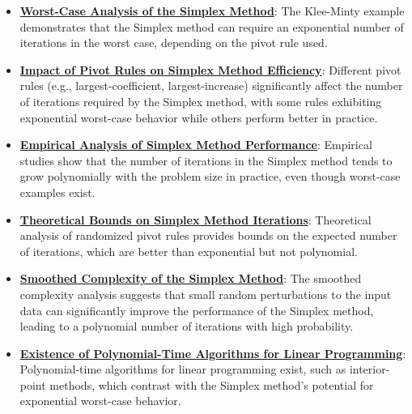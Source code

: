 \documentclass{article}%
\begin{document}
\begin{itemize}[leftmargin=*]%
\item \href{https://www.math.purdue.edu/~yipn/421/2024-09-05-SimplexEfficiency.pdf#page=2}{\textbf{Worst{-}Case Analysis of the Simplex Method}}: The Klee-Minty example demonstrates that the Simplex method can require an exponential number of iterations in the worst case, depending on the pivot rule used.%
\item \href{https://www.math.purdue.edu/~yipn/421/2024-09-05-SimplexEfficiency.pdf#page=3}{\textbf{Impact of Pivot Rules on Simplex Method Efficiency}}: Different pivot rules (e.g., largest-coefficient, largest-increase) significantly affect the number of iterations required by the Simplex method, with some rules exhibiting exponential worst-case behavior while others perform better in practice.%
\item \href{https://www.math.purdue.edu/~yipn/421/2024-09-05-SimplexEfficiency.pdf#page=9}{\textbf{Empirical Analysis of Simplex Method Performance}}: Empirical studies show that the number of iterations in the Simplex method tends to grow polynomially with the problem size in practice, even though worst-case examples exist.%
\item \href{https://www.math.purdue.edu/~yipn/421/2024-09-05-SimplexEfficiency.pdf#page=10}{\textbf{Theoretical Bounds on Simplex Method Iterations}}: Theoretical analysis of randomized pivot rules provides bounds on the expected number of iterations, which are better than exponential but not polynomial.%
\item \href{https://www.math.purdue.edu/~yipn/421/2024-09-05-SimplexEfficiency.pdf#page=11}{\textbf{Smoothed Complexity of the Simplex Method}}: The smoothed complexity analysis suggests that small random perturbations to the input data can significantly improve the performance of the Simplex method, leading to a polynomial number of iterations with high probability.%
\item \href{https://www.math.purdue.edu/~yipn/421/2024-09-05-SimplexEfficiency.pdf#page=12}{\textbf{Existence of Polynomial{-}Time Algorithms for Linear Programming}}: Polynomial-time algorithms for linear programming exist, such as interior-point methods, which contrast with the Simplex method's potential for exponential worst-case behavior.%
\end{itemize}%
\end{document}
